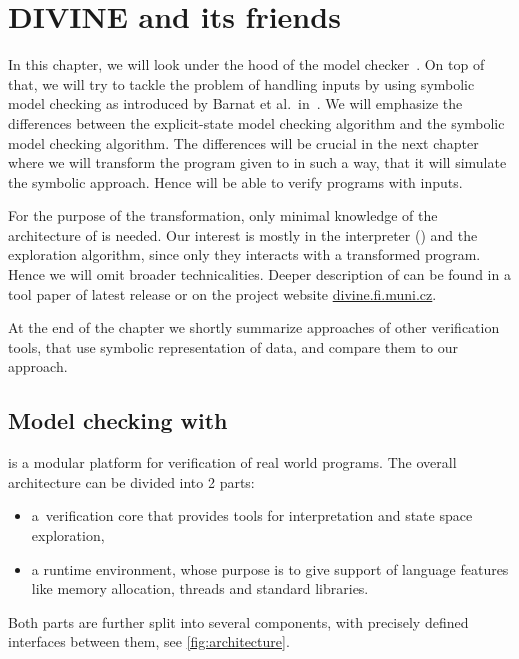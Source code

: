 \chapter{DIVINE and its friends}\label{ch:divine}

In this chapter, we will look under the hood of the \DIVINE model
checker~\cite{Divine17}.  On top of that, we will try to tackle the problem of
handling inputs by using symbolic model checking as introduced by Barnat et
al.~in~\cite{Barnat14}. We will emphasize the differences between the
explicit-state model checking algorithm and the symbolic model checking algorithm.
The differences will be crucial in the next chapter where we will transform the
program given to \DIVINE in such a way, that it will simulate the symbolic approach.
Hence \DIVINE will be able to verify programs with inputs.

For the purpose of the transformation, only minimal knowledge of the architecture of
\DIVINE is needed. Our interest is mostly in the \LLVM interpreter (\DIVM) and
the exploration algorithm, since only they interacts with a transformed program.
Hence we will omit broader technicalities. Deeper description of \DIVINE can be
found in a tool paper of latest release \cite{Divine17} or on the project website
\href{https://divine.fi.muni.cz/}{divine.fi.muni.cz}.

At the end of the chapter we shortly summarize approaches of other verification
tools, that use symbolic representation of data, and compare them to our approach.

\section{Model checking with \DIVINE}

\DIVINE is a
modular platform for verification of real world programs. The overall
architecture
can be divided into 2 parts:
\begin{itemize}
    \item a~verification core that provides tools for \LLVM interpretation and
        state space exploration,
    \item a runtime environment, whose purpose is to give support of
        language features like memory allocation, threads and standard
        libraries.
\end{itemize}
Both parts are further split into several components,
with precisely defined interfaces between them, see \autoref{fig:architecture}.

